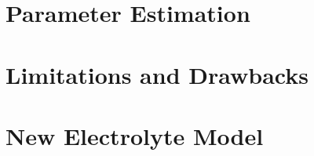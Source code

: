 \section{ Parameter Estimation}\label{sec:spmparameterestim}
\section{Limitations and Drawbacks}\label{subsec:basicspmlimitations}


\section{New Electrolyte Model}\label{sec:newelectrolytemodel}




